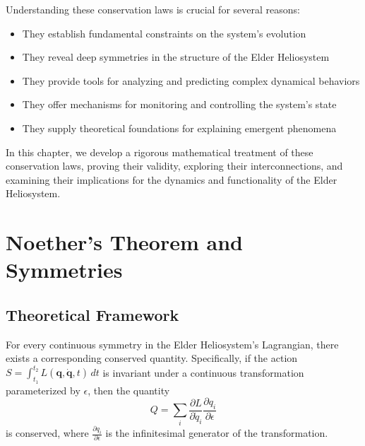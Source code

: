 Understanding these conservation laws is crucial for several reasons:

\begin{itemize}
    \item They establish fundamental constraints on the system's evolution
    \item They reveal deep symmetries in the structure of the Elder Heliosystem
    \item They provide tools for analyzing and predicting complex dynamical behaviors
    \item They offer mechanisms for monitoring and controlling the system's state
    \item They supply theoretical foundations for explaining emergent phenomena
\end{itemize}

In this chapter, we develop a rigorous mathematical treatment of these conservation laws, proving their validity, exploring their interconnections, and examining their implications for the dynamics and functionality of the Elder Heliosystem.

\section{Noether's Theorem and Symmetries}

\subsection{Theoretical Framework}

\begin{theorem}
For every continuous symmetry in the Elder Heliosystem's Lagrangian, there exists a corresponding conserved quantity. Specifically, if the action $S = \int_{t_1}^{t_2} L(\mathbf{q}, \dot{\mathbf{q}}, t) \, dt$ is invariant under a continuous transformation parameterized by $\epsilon$, then the quantity
\begin{equation}
Q = \sum_i \frac{\partial L}{\partial \dot{q}_i} \frac{\partial q_i}{\partial \epsilon}
\end{equation}
is conserved, where $\frac{\partial q_i}{\partial \epsilon}$ is the infinitesimal generator of the transformation.
\end{theorem}

